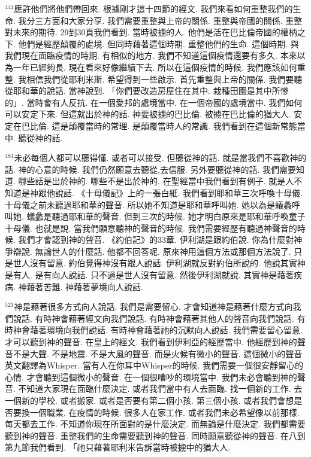 \documentclass{book}
\begin{document}
$^{441}$應許他們將他們帶回來.
根據剛才這十四節的經文.
我們來看如何重整我們的生命.
我分三方面和大家分享.
我們需要重整與上帝的關係.
重整與帝國的關係.
重整對未來的期待.
29到30頁我們看到.
當時被擄的人.
他們是活在巴比倫帝國的權柄之下.
他們是經歷顛覆的處境.
但同時藉著這個時期.
重整他們的生命.
這個時期.
與我們現在面臨疫情的時期.
有相似的地方.
我們不知道這個疫情還要有多久.
本來以為一年已經夠長.
現在看來好像繼續下去.
所以在這個疫情的時候.
我們應該如何重整.
我相信我們從耶利米斯.
希望得到一些啟示.
首先重整與上帝的關係.
我們要聽從耶和華的說話.
當神說到.
「你們要改造房屋住在其中.
栽種田園是其中所慘的」.
當時會有人反抗.
在一個愛邦的處境當中.
在一個帝國的處境當中.
我們如何可以安定下來.
但這就出於神的話.
神要被擄的巴比倫.
被擄在巴比倫的猶大人.
安定在巴比倫.
這是顛覆當時的常理.
是顛覆當時人的常識.
我們看到在這個新常態當中.
聽從神的話.

$^{481}$未必每個人都可以聽得懂.
或者可以接受.
但聽從神的話.
就是當我們不喜歡神的話.
神的心意的時候.
我們仍然願意去聽從,去信服.
另外要聽從神的話.
我們需要知道.
哪些話是出於神的.
哪些不是出於神的.
在聖經當中我們看到有例子.
就是人不知道是神跟他說話.
《十母儀記》上的一張白紙.
我們看到耶和華三次呼喚十母儀.
十母儀之前未聽過耶和華的聲音.
所以她不知道是耶和華呼叫她.
她以為是蟻蠡呼叫她.
蟻蠡是聽過耶和華的聲音.
但到三次的時候.
她才明白原來是耶和華呼喚童子十母儀.
也就是說.
當我們願意聽神的聲音的時候.
我們需要經歷有聽過神聲音的時候.
我們才會認到神的聲音.
《約伯記》的33章.
伊利湖是跟約伯說.
你為什麼對神爭辯說.
無論世人的什麼話.
他都不回答呢.
原來神用這個方法或那個方法說了.
只是世人沒有留意.
約伯覺得神沒有跟人說話.
伊利湖就反對約伯所說的.
他說其實神是有人.
是有向人說話.
只不過是世人沒有留意.
然後伊利湖就說.
其實神是藉著疾病.
神藉著苦難.
神藉著夢境向人說話.

$^{521}$神是藉著很多方式向人說話.
我們是需要留心.
才會知道神是藉著什麼方式向我們說話.
有時神會藉著經文向我們說話.
有時神會藉著其他人的聲音向我們說話.
有時神會藉著環境向我們說話.
有時神會藉著祂的沉默向人說話.
我們需要留心留意.
才可以聽到神的聲音.
在皇上的經文.
我們看到伊利亞的經歷當中.
他經歷到神的聲音不是大聲.
不是地震.
不是大風的聲音.
而是火候有微小的聲音.
這個微小的聲音英文翻譯為Whisper.
當有人在你耳中Whisper的時候.
我們需要一個很安靜留心的心情.
才會聽到這個微小的聲音.
在一個很嘈吵的環境當中.
我們未必會聽到神的聲音.
不知道大家現在面臨什麼決定.
或者我們當中有人去面臨.
找一個新的工作.
去一個新的學校.
或者搬家.
或者是否要有第二個小孩.
第三個小孩.
或者我們會想是否要換一個職業.
在疫情的時候.
很多人在家工作.
或者我們未必希望像以前那樣.
每天都去工作.
不知道你現在所面對的是什麼決定.
而無論是什麼決定.
我們都需要聽到神的聲音.
重整我們的生命需要聽到神的聲音.
同時願意聽從神的聲音.
在八到第九節我們看到.
「祂只藉著耶利米告訴當時被擄中的猶大人.
\end{document}
